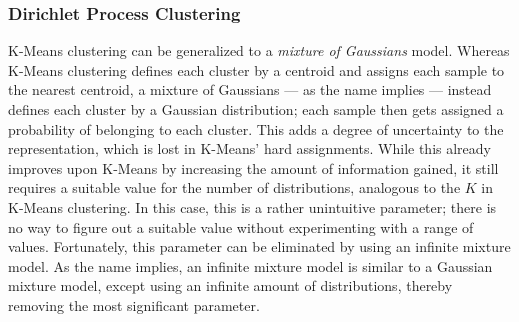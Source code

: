\subsubsection{Dirichlet Process Clustering}
K-Means clustering can be generalized to a \emph{mixture of Gaussians} model.
Whereas K-Means clustering defines each cluster by a centroid and assigns each
sample to the nearest centroid, a mixture of Gaussians --- as the name implies
--- instead defines each cluster by a Gaussian distribution; each sample then
gets assigned a probability of belonging to each cluster. This adds a degree
of uncertainty to the representation, which is lost in K-Means' hard
assignments. While this already improves upon K-Means by increasing the amount
of information gained, it still requires a suitable value for the number of
distributions, analogous to the $K$ in K-Means clustering. In this case, this
is a rather unintuitive parameter; there is no way to figure out a suitable
value without experimenting with a range of values. Fortunately, this
parameter can be eliminated by using an infinite mixture model. As the name
implies, an infinite mixture model is similar to a Gaussian mixture model,
except using an infinite amount of distributions, thereby removing the most
significant parameter.

